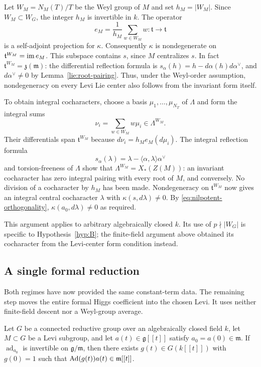 Let $W_M=N_M(T)/T$ be the Weyl group of $M$ and set $h_M=|W_M|$.
Since $W_M\subset W_G$, the integer $h_M$ is invertible in $k$.
The operator
\[
 e_M=\frac1{h_M}\sum_{w\in W_M}w:\mathfrak t\longrightarrow\mathfrak t
\]
is a self-adjoint projection for $\kappa$.
Consequently $\kappa$ is nondegenerate on
$\mathfrak t^{W_M}=\operatorname{im} e_M$.  This subspace contains $s$, since
$M$ centralizes $s$.
In fact $\mathfrak t^{W_M}=\mathfrak z(\mathfrak m)$:
the differential reflection formula is
$s_\alpha(h)=h-d\alpha(h)d\alpha^\vee$, and
$d\alpha^\vee\ne0$ by Lemma~\ref{lie:root-pairing}.
Thus, under the Weyl-order assumption, nondegeneracy on every Levi
Lie center also follows from the invariant form itself.

To obtain integral cocharacters, choose a basis
$\mu_1,\ldots,\mu_{N_T}$ of $\Lambda$ and form the integral sums
\[
 \nu_i=\sum_{w\in W_M}w\mu_i\in\Lambda^{W_M}.
\]
Their differentials span $\mathfrak t^{W_M}$ because
$d\nu_i=h_Me_M(d\mu_i)$.  The integral reflection formula
\[
 s_\alpha(\lambda)=\lambda-
             \langle\alpha,\lambda\rangle\alpha^\vee
\]
and torsion-freeness of $\Lambda$ show that
$\Lambda^{W_M}=X_*(Z(M))$: an invariant cocharacter has zero
integral pairing with every root of $M$, and conversely.
No division of a cocharacter by $h_M$ has been made.
Nondegeneracy on $\mathfrak t^{W_M}$ now gives an integral central
cocharacter $\lambda$ with $\kappa(s,d\lambda)\ne0$.
By \eqref{eq:nilpotent-orthogonality},
$\kappa(a_0,d\lambda)\ne0$ as required.

This argument applies to arbitrary algebraically closed $k$.
Its use of $p\nmid|W_G|$ is specific to Hypothesis~\ref{hyp:B};
the finite-field argument above obtained its cocharacter from the
Levi-center form condition instead.

\subsection{A single formal reduction}

Both regimes have now provided the same constant-term data.
The remaining step moves the entire formal Higgs coefficient into
the chosen Levi.  It uses neither finite-field descent nor a
Weyl-group average.

\begin{lemma}\label{lie:formal}
Let $G$ be a connected reductive group over an algebraically closed
field $k$, let $M\subset G$ be a Levi subgroup, and let
$a(t)\in\mathfrak g[[t]]$ satisfy $a_0=a(0)\in\mathfrak m$.
If $\operatorname{ad}_{a_0}$ is invertible on $\mathfrak g/\mathfrak m$, then
there exists $g(t)\in G(k[[t]])$ with $g(0)=1$ such that
$\operatorname{Ad}(g(t))a(t)\in\mathfrak m[[t]]$.
\end{lemma}


